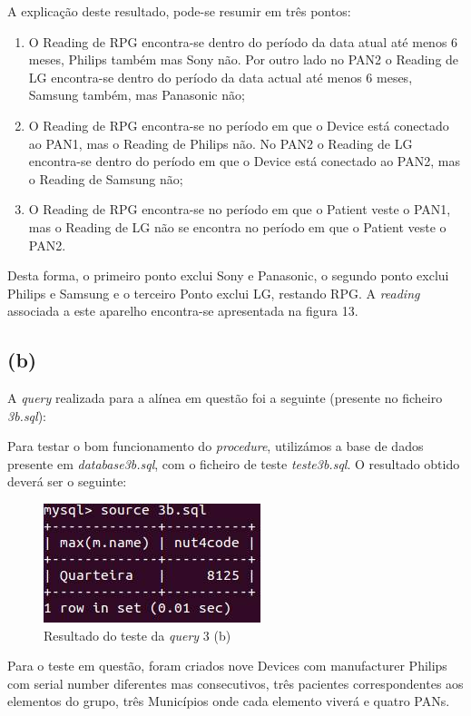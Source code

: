 \documentclass[a4paper]{article}
\begin{document}
A explicação deste resultado, pode-se resumir em três pontos:

\begin{enumerate}
\item O Reading de RPG encontra-se dentro do período da data atual até 
	menos 6 meses, Philips também mas Sony não. Por outro lado no PAN2
	o Reading de LG encontra-se dentro do período da data actual até 
	menos 6 meses, Samsung também, mas Panasonic não;
\item O Reading de RPG encontra-se no período em que o Device está 
	conectado ao PAN1, mas o Reading de Philips não. No PAN2 o Reading
	de LG encontra-se dentro do período em que o Device está conectado  
	ao PAN2, mas o Reading de Samsung não;
\item O Reading de RPG encontra-se no período em que o Patient veste o
	PAN1, mas o Reading de LG não se encontra no período em que o Patient
	veste o PAN2.
\end{enumerate}

Desta forma, o primeiro ponto exclui Sony e Panasonic, o segundo ponto exclui Philips e Samsung e o terceiro Ponto exclui LG, restando RPG. A \textit{reading} associada a este aparelho encontra-se apresentada na figura 13.

\subsection*{(b)}
A \textit{query} realizada para a alínea em questão foi a seguinte (presente no ficheiro \textit{3b.sql}):



Para testar o bom funcionamento do \textit{procedure}, utilizámos a base de dados presente em \textit{database3b.sql}, com o ficheiro de teste \textit{teste3b.sql}.
\vskip 5mm
O resultado obtido deverá ser o seguinte:

\begin{figure}[ht!]
\centering
\includegraphics[scale=0.53]{3b.jpg}
\caption{Resultado do teste da \textit{query} 3 (b)}
\end{figure}

Para o teste em questão, foram criados nove Devices com manufacturer Philips com serial number
	diferentes mas consecutivos, três pacientes correspondentes aos elementos
	do grupo, três Municípios onde cada elemento viverá e quatro PANs.
	
\end{document}
